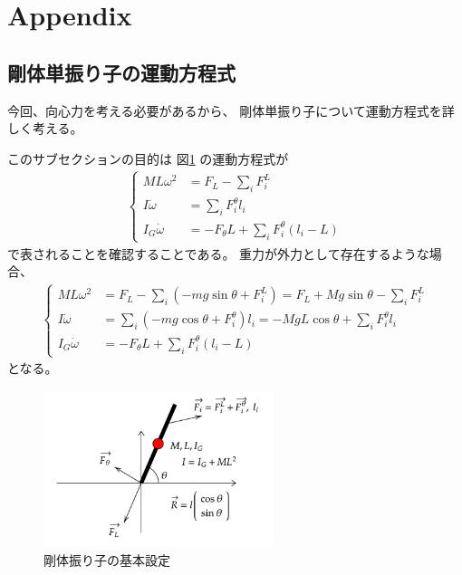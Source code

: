 \documentclass[a4paper,11pt]{jsarticle}
\begin{document}
\clearpage
\section{Appendix}
\label{sec:appendix}
\subsection{剛体単振り子の運動方程式}
今回、向心力を考える必要があるから、
剛体単振り子について運動方程式を詳しく考える。

このサブセクションの目的は
図\ref*{Appendix_base_config.png}
の運動方程式が
\begin{align*}
  \begin{cases}
    ML\omega^2  &= F_L - \sum_i F_i^L
    \\
    I\dot\omega &= \sum_i F_i^\theta l_i
    \\
    I_G\dot\omega &= -F_\theta L + \sum_i F_i^\theta ( l_i - L )
  \end{cases}
\end{align*}
で表されることを確認することである。
重力が外力として存在するような場合、
\begin{align*}
  \begin{cases}
    ML\omega^2  &= F_L - \sum_i ( -mg\sin\theta + F_i^L ) = F_L + Mg\sin\theta - \sum_i F_i^L
    \\
    I\dot\omega &= \sum_i ( -mg\cos\theta + F_i^\theta ) l_i = -MgL\cos\theta + \sum_i F_i^\theta l_i
    \\
    I_G\dot\omega &= -F_\theta L + \sum_i F_i^\theta ( l_i - L )
  \end{cases}
\end{align*}
となる。


\begin{figure}[h]
  \centering
  \includegraphics[width = 0.6\textwidth]{Appendix_base_config.png}
  \caption{剛体振り子の基本設定}
  \label{Appendix_base_config.png}
\end{figure}
\end{document}

